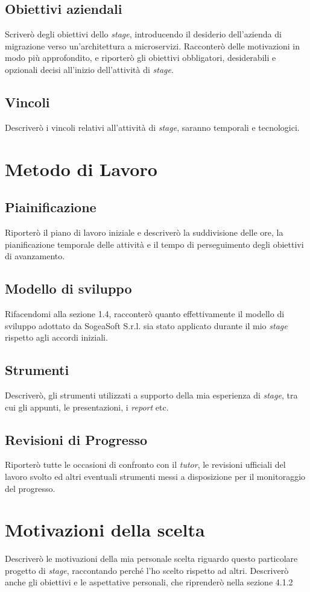         \subsection{Obiettivi aziendali}
        Scriverò degli obiettivi dello \textit{stage}, introducendo il desiderio dell'azienda di migrazione verso un'architettura a microservizi. Racconterò delle motivazioni in modo più approfondito, e riporterò gli obiettivi obbligatori, desiderabili e opzionali decisi all'inizio dell'attività di \textit{stage}.
        \subsection{Vincoli}
        Descriverò i vincoli relativi all'attività di \textit{stage}, saranno temporali e tecnologici. 

    \section{Metodo di Lavoro}
        \subsection{Piainificazione}
        Riporterò il piano di lavoro iniziale e descriverò la suddivisione delle ore, la pianificazione temporale delle attività e il tempo di perseguimento degli obiettivi di avanzamento. 
        \subsection{Modello di sviluppo}
        Rifacendomi alla sezione 1.4, racconterò quanto effettivamente il modello di sviluppo adottato da SogeaSoft S.r.l. sia stato applicato durante il mio \textit{stage} rispetto agli accordi iniziali. 
        \subsection{Strumenti}
        Descriverò, gli strumenti utilizzati a supporto della mia esperienza di \textit{stage}, tra cui gli appunti, le presentazioni, i \textit{report} etc. 
        \subsection{Revisioni di Progresso}
        Riporterò tutte le occasioni di confronto con il \textit{tutor}, le revisioni ufficiali del lavoro svolto ed altri eventuali strumenti messi a disposizione per il monitoraggio del progresso. 
    \section{Motivazioni della scelta}
    Descriverò le motivazioni della mia personale scelta riguardo questo particolare progetto di \textit{stage}, raccontando perché l'ho scelto rispetto ad altri. Descriverò anche gli obiettivi e le aspettative personali, che riprenderò nella sezione 4.1.2
    
        